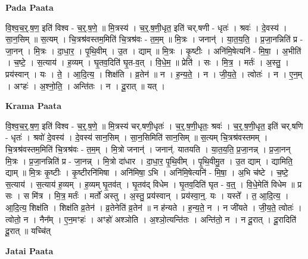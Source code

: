 \documentclass[17pt]{extarticle}
\begin{document}
\textbf{Pada Paata} \newline

वि॒श्व॒च॒र्॒.ष॒ण॒ इति॑ विश्व - च॒र्॒.ष॒णे॒ ॥ मि॒त्रस्य॑ । च॒र्॒.ष॒णी॒धृत॒ इति॑ चर्.षणी - धृतः॑ । श्रवः॑ । दे॒वस्य॑ । सा॒न॒सिम् ॥ स॒त्यम् । चि॒त्रश्र॑वस्तम॒मिति॑ चि॒त्रश्र॑वः - त॒म॒म् ॥ मि॒त्रः । जनान्॑ । या॒त॒य॒ति॒ । प्र॒जा॒नन्निति॑ प्र - जा॒नन् । मि॒त्रः । दा॒धा॒र॒ । पृ॒थि॒वीम् । उ॒त । द्याम् ॥ मि॒त्रः । कृ॒ष्टीः । अनि॑मि॒षेत्यनि॑ - मि॒षा॒ । अ॒भीति॑ । च॒ष्टे॒ । स॒त्याय॑ । ह॒व्यम् । घृ॒तव॒दिति॑ घृ॒त-व॒त् । वि॒धे॒म॒ ॥ प्रेति॑ । सः । मि॒त्र॒ । मर्तः॑ । अ॒स्तु॒ । प्रय॑स्वान् । यः । ते॒ । आ॒दि॒त्य॒ । शिक्ष॑ति । व्र॒तेन॑ ॥ न । ह॒न्य॒ते॒ । न । जी॒य॒ते॒ । त्वोतः॑ । न । ए॒न॒म् । अꣳहः॑ । अ॒श्नो॒ति॒ । अन्ति॑तः । न । दू॒रात् ॥ यत् ।  \newline


\textbf{Krama Paata} \newline

वि॒श्व॒च॒र्॒.ष॒ण॒ इति॑ विश्व - च॒र्॒.ष॒णे॒ ॥  मि॒त्रस्य॑ चर्.षणी॒धृतः॑ । च॒र्॒.ष॒णी॒धृतः॒ श्रवः॑ । च॒र्॒.ष॒णी॒धृत॒ इति॑ चर्.षणि - धृतः॑ । श्रवो॑ दे॒वस्य॑ । दे॒वस्य॑ सान॒सिम् । सा॒न॒सिमिति॑ सान॒सिम् ॥ स॒त्यम् चि॒त्रश्र॑वस्तमम् । चि॒त्रश्र॑वस्तम॒मिति॑ चि॒त्रश्र॑वः - त॒म॒म् । मि॒त्रो जनान्॑ । जनान्॑. यातयति । या॒त॒य॒ति॒ प्र॒जा॒नन्न् । प्र॒जा॒नन् मि॒त्रः । प्र॒जा॒नन्निति॑ प्र - जा॒नन्न् । मि॒त्रो दा॑धार । दा॒धा॒र॒ पृ॒थि॒वीम् । पृ॒थि॒वीमु॒त । उ॒त द्याम् । द्यामिति॒ द्याम् ॥ मि॒त्रः कृ॒ष्टीः । कृ॒ष्टीरनि॑मिषा । अनि॑मिषा॒ ऽभि । अनि॑मि॒षेत्यनि॑ - मि॒षा॒ । 
अ॒भि च॑ष्टे । च॒ष्टे॒ स॒त्याय॑ । स॒त्याय॑ ह॒व्यम् । ह॒व्यम् घृ॒तव॑त् । घृ॒तव॑द् विधेम । घृ॒तव॒दिति॑ घृत - व॒त्॒ । वि॒धे॒मेति॑ विधेम ॥ प्र सः । स मि॑त्र । मि॒त्र॒ मर्तः॑ । मर्तो॑ अस्तु । अ॒स्तु॒ प्रय॑स्वान् । प्रय॑स्वा॒न्॒. यः । यस्ते᳚ । त॒ आ॒दि॒त्य॒ । आ॒दि॒त्य॒ शिक्ष॑ति । शिक्ष॑ति व्र॒तेन॑ । व्र॒तेनेति॑ व्र॒तेन॑ ॥ न ह॑न्यते । ह॒न्य॒ते॒ न । न जी॑यते । जी॒य॒ते॒ त्वोतः॑ । त्वोतो॒ न । नैन᳚म् । ए॒न॒मꣳहः॑ । अꣳहो॑ अश्ञोति । अ॒श्ञो॒त्यन्ति॑तः । अन्ति॑तो॒ न । न दू॒रात् । दू॒रादिति॑ दू॒रात् ॥ यच्चि॑त् \newline

\textbf{Jatai Paata} \newline
\end{document}
